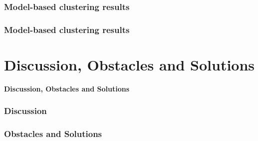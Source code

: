 \documentclass{beamer}
\begin{document}
\begin{frame}
\frametitle{Model-based clustering results}
\begin{center}

\end{center}
\end{frame}



\begin{frame}
\frametitle{Model-based clustering results}
\begin{center}

\end{center}
\end{frame}





















\section{Discussion, Obstacles and Solutions}
\begin{frame}
\begin{center}
\textbf{Discussion, Obstacles and Solutions}
\end{center} 
\end{frame}
\begin{frame}
\frametitle{Discussion}


\end{frame}

\begin{frame}
\frametitle{Obstacles and Solutions}

\end{frame}
\end{document}
